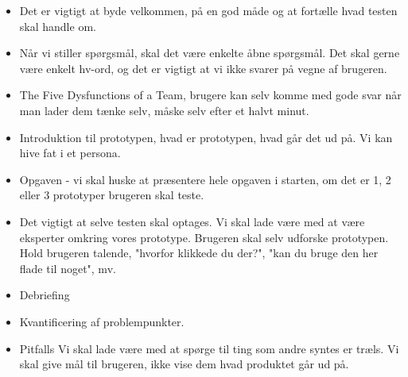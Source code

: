 \documentclass{article}
\begin{document}
\begin{itemize}
  \item Det er vigtigt at byde velkommen, på en god måde og at fortælle hvad
    testen skal handle om.
  \item Når vi stiller spørgsmål, skal det være enkelte åbne spørgsmål. Det skal
    gerne være enkelt hv-ord, og det er vigtigt at vi ikke svarer på vegne af
    brugeren.
  \item The Five Dysfunctions of a Team, brugere kan selv komme med gode svar
    når man lader dem tænke selv, måske selv efter et halvt minut. 
  \item Introduktion til prototypen, hvad er prototypen, hvad går det ud på. Vi
    kan hive fat i et persona. 
  \item Opgaven - vi skal huske at præsentere hele opgaven i starten, om det er
    1, 2 eller 3 prototyper brugeren skal teste.
  \item Det vigtigt at selve testen skal optages. Vi skal lade være med at være
    eksperter omkring vores prototype. Brugeren skal selv udforske prototypen.
    Hold brugeren talende, "hvorfor klikkede du der?", "kan du bruge den her
    flade til noget", mv.
  \item Debriefing
  \item Kvantificering af problempunkter. 
  \item Pitfalls
    \subitem Vi skal lade være med at spørge til ting som andre syntes er træls.
    Vi skal give mål til brugeren, ikke vise dem hvad produktet går ud på.
\end{itemize}
\end{document}
